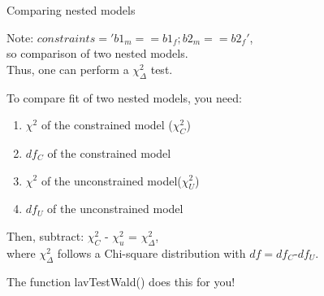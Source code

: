 \documentclass[10pt]{beamer}\usepackage[]{graphicx}\usepackage[]{xcolor}
\begin{document}
%
% 
% 
% 
% 
% 
%
\begin{frame}[fragile]{Comparing nested models}

Note: $constraints = 'b1_m == b1_f; b2_m == b2_f'$,\\
so comparison of two nested models.\\
Thus, one can perform a ${\chi}^2_\Delta$ test.

\vspace{5mm}

To compare fit of two nested models, you need:
\begin{enumerate}
    \item ${\chi}^2$ of the constrained model (${\chi}^2_C$)
    \item $df_C$ of the constrained model
    \item ${\chi}^2$ of the unconstrained model(${\chi}^2_U$)
    \item $df_U$ of the unconstrained model 
\end{enumerate}

Then, subtract: ${\chi}^2_C$ - ${\chi}^2_u$ = ${\chi}^2_\Delta$,\\
where ${\chi}^2_\Delta$ follows a Chi-square distribution with $df = df_C$-$df_U$. 

\vspace{5mm}

The function lavTestWald() does this for you!

\end{frame}
\end{document}
